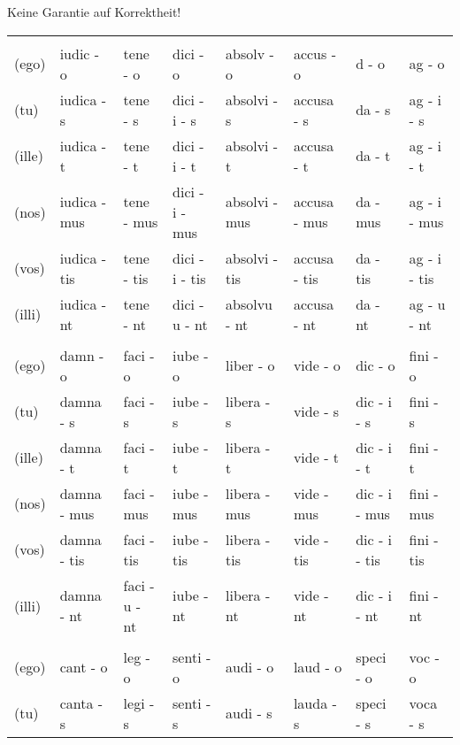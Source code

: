\documentclass[a4paper, landscape]{article}
\begin{document}
\begin{landscape}
\begin{table}[]
	\begin{center}
		Keine Garantie auf Korrektheit! \\
	\end{center}
\begin{tabular}{llllllll}
	& & & &  &  &  & \\
	(ego)	& iudic - o		& tene - o		& dici - o			& absolv - o	 & accus  - o   & d -  o		& ag - o \\ 
	(tu)	& iudica - s	& tene - s		& dici - i - s		& absolvi - s    & accusa - s   & da - s		& ag - i - s \\
	(ille)	& iudica - t	& tene - t		& dici - i - t		& absolvi - t    & accusa - t   & da - t		& ag - i - t \\
	(nos)	& iudica - mus	& tene - mus	& dici - i - mus	& absolvi - mus & accusa - mus & da - mus		& ag - i - mus \\
	(vos)	& iudica - tis	& tene - tis	& dici - i - tis	& absolvi - tis  & accusa - tis & da - tis		& ag - i - tis \\
	(illi)	& iudica - nt	& tene - nt		& dici - u - nt		& absolvu - nt	 & accusa - nt  & da - nt		& ag - u - nt \\
	& & & &  &  &  & \\
	(ego)	& damn	- o		& faci - o		& iube - o 	 & liber  - o   & vide - o   & dic     - o	 & fini - o  \\ 
	(tu)	& damna - s		& faci - s		& iube - s	 & libera - s   & vide - s	 & dic - i - s	 & fini - s \\
	(ille)	& damna - t		& faci - t		& iube - t	 & libera - t   & vide - t	 & dic - i - t 	 & fini - t  \\
	(nos)	& damna - mus	& faci - mus	& iube - mus & libera - mus & vide - mus & dic - i - mus & fini - mus \\
	(vos)	& damna - tis	& faci - tis	& iube - tis & libera - tis & vide - tis & dic - i - tis & fini - tis \\
	(illi)	& damna - nt	& faci - u - nt	& iube - nt	 & libera - nt  & vide - nt  & dic - i - nt	 & fini - nt \\
	& & & &  &  &  & \\
	(ego)	& cant  - o		& leg -  o		& senti - o		& audi - o		& laud - o		& speci - o		 & voc - o \\
	(tu)	& canta - s		& legi - s		& senti - s		& audi - s		& lauda - s		& speci - s		 & voca - s \\

\end{tabular}
\end{table}
\end{landscape}
\end{document}
